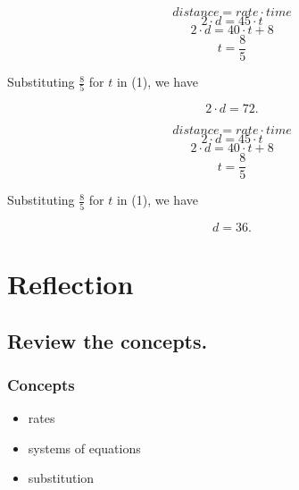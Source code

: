 \documentclass{beamer} %
\begin{document}
\setcounter{equation}{0}

\begin{frame}
  \[distance = rate \cdot time\]
  \begin{equation}
    2\cdot d = 45\cdot t
  \end{equation}
  \begin{equation}
    2\cdot d = 40\cdot t + 8
  \end{equation}
  \begin{equation}
    t = \frac{8}{5}
  \end{equation}

  Substituting $\frac{8}{5}$ for $t$ in (1), we have

  \[2\cdot d = 72.\]
\end{frame}

\setcounter{equation}{0}

\begin{frame}
  \[distance = rate \cdot time\]
  \begin{equation}
    2\cdot d = 45\cdot t
  \end{equation}
  \begin{equation}
    2\cdot d = 40\cdot t + 8
  \end{equation}
  \begin{equation}
    t = \frac{8}{5}
  \end{equation}

  Substituting $\frac{8}{5}$ for $t$ in (1), we have

  \[d = \boxed{36}.\]
\end{frame}

\section{Reflection}

\subsection*{Review the concepts.}

\begin{frame}
  \frametitle{Concepts}
  \pause
  \begin{itemize}
    \item rates \pause
    \item systems of equations \pause
    \item substitution
  \end{itemize}
\end{frame}
\end{document}

